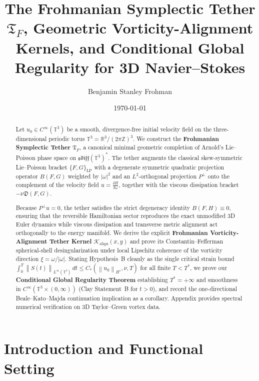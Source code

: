 \documentclass[11pt,reqno]{amsart}
\title[Frohmanian Symplectic Tether and Vorticity Alignment on $\mathbb{T}^3$]{The Frohmanian Symplectic Tether $\mathfrak{T}_F$, Geometric Vorticity-Alignment Kernels, and Conditional Global Regularity for 3D Navier--Stokes}
\author{Benjamin Stanley Frohman}
\date{\today}
\theoremstyle{definition}
\newcommand{\T}{\mathbb{T}^3}
\newcommand{\R}{\mathbb{R}}
\newcommand{\Z}{\mathbb{Z}}
\newcommand{\sdiff}{\mathfrak{sdiff}(\T)}
\newcommand{\TF}{\mathfrak{T}_F}
\newcommand{\Pperp}{P^\perp}
\newcommand{\norm}[1]{\left\| #1 \right\|}
\begin{document}
\begin{abstract}
Let $u_0 \in C^\infty(\T)$ be a smooth, divergence-free initial velocity field on the three-dimensional periodic torus $\T = \R^3 / (2\pi\Z)^3$. We construct the \textbf{Frohmanian Symplectic Tether} $\TF$, a canonical minimal geometric completion of Arnold's Lie--Poisson phase space on $\sdiff^*$. The tether augments the classical skew-symmetric Lie--Poisson bracket $\{F, G\}_{\mathrm{LP}}$ with a degenerate symmetric quadratic projection operator $B(F, G)$ weighted by $|\omega|^2$ and an $L^2$-orthogonal projection $\Pperp$ onto the complement of the velocity field $u = \frac{\delta H}{\delta \omega}$, together with the viscous dissipation bracket $-\nu \mathfrak{D}(F, G)$.

Because $\Pperp u = 0$, the tether satisfies the strict degeneracy identity $B(F, H) \equiv 0$, ensuring that the reversible Hamiltonian sector reproduces the exact unmodified 3D Euler dynamics while viscous dissipation and transverse metric alignment act orthogonally to the energy manifold. We derive the explicit \textbf{Frohmanian Vorticity-Alignment Tether Kernel} $\mathcal{K}_{\mathrm{align}}(x, y)$ and prove its Constantin--Fefferman spherical-shell desingularization under local Lipschitz coherence of the vorticity direction $\xi = \omega / |\omega|$. Stating Hypothesis~B cleanly as the single critical strain bound $\int_0^T \norm{S(t)}_{L^\infty(\T)}\,dt \le C_*(\norm{u_0}_{H^s}, \nu, T)$ for all finite $T < T^*$, we prove our \textbf{Conditional Global Regularity Theorem} establishing $T^*=+\infty$ and smoothness in $C^\infty(\T \times (0, \infty))$ (Clay Statement~B for $t>0$), and record the one-directional Beale--Kato--Majda continuation implication as a corollary. Appendix provides spectral numerical verification on 3D Taylor--Green vortex data.
\end{abstract}

\maketitle
{}\par\medskip

\section{Introduction and Functional Setting}
\end{document}
